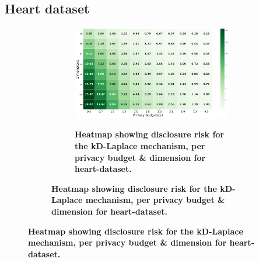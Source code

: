 \subsection{Heart dataset} \label{appendix:results-privacy-heart-dataset}
\begin{figure}[H]
    \centering
    \begin{subfigure}[b]{0.85\textwidth}
        \begin{subfigure}[c]{1\textwidth}
            \caption{\textbf{Heatmap showing disclosure risk for the kD-Laplace mechanism, per privacy budget \& dimension for heart-dataset.}}
            \includegraphics[width=1\textwidth]{Results/kd-laplace/kd-Laplace/heart-dataset/distance.png}
            \label{fig:privacy_risk_heart-dataset_adversial_advantage_kd-laplace}
        \end{subfigure}
        \vfill %


\end{subfigure}
\end{figure}
